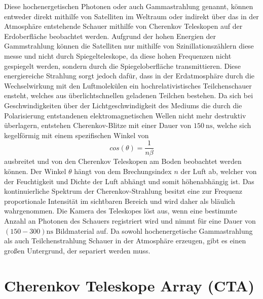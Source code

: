 Diese hochenergetischen Photonen oder auch Gammastrahlung genannt, können entweder direkt mithilfe von Satelliten im Weltraum oder indirekt über das in
der Atmosphäre entstehende Schauer mithilfe von Cherenkov Teleskopen auf der Erdoberfläche beobachtet werden.
Aufgrund der hohen Energien der Gammstrahlung können die Satelliten nur mithilfe von Szinillationszählern diese messe und nicht durch Spiegelteleskope,
da diese hohen Frequenzen nicht gespiegelt werden, sondern durch die Spiegeloberfläche transmittieren.
Diese energiereiche Strahlung sorgt jedoch dafür, dass in der Erdatmosphäre durch die Wechselwirkung mit den Luftmolekülen ein hochrelativistisches
Teilchenschauer ensteht, welches aus überlichtschnellen geladenen Teilchen bestehen.
Da sich bei Geschwindigkeiten über der Lichtgeschwindigkeit des Mediums die durch die Polarisierung entstandenen elektromagnetischen Wellen
nicht mehr destruktiv überlagern, entstehen Cherenkov-Blitze mit einer Dauer von $\SI{150}{\nano\s}$\cite{Cherenkov_Licht}, welche sich kegelförmig
mit einem spezifischen Winkel von
\begin{equation}
 cos(\theta) = \frac{1}{n\beta}
\end{equation}
ausbreitet und von den Cherenkov
Teleskopen am Boden beobachtet werden können.
Der Winkel $\theta$ hängt von dem Brechungsindex $n$ der Luft ab, welcher von der Feuchtigkeit und Dichte der Luft abhängt und somit höhenabhängig ist.
Das kontinuierliche Spektrum der Cherenkov-Strahlung besitzt eine zur Frequenz proportionale Intensität im sichtbaren Bereich und
wird daher als bläulich wahrgenommen.
Die Kamera des Teleskopes löst aus, wenn eine bestimmte Anzahl an Photonen des Schauers registriert wird und nimmt
für eine Dauer von $(150-300)\si{\nano\s}$ Bildmaterial auf.
Da sowohl hochenergetische Gammastrahlung als auch Teilchenstrahlung
Schauer in der Atmosphäre erzeugen, gibt es einen großen Untergrund, der separiert werden muss.

\section{Cherenkov Teleskope Array (CTA)}
\label{sec:CTA}

